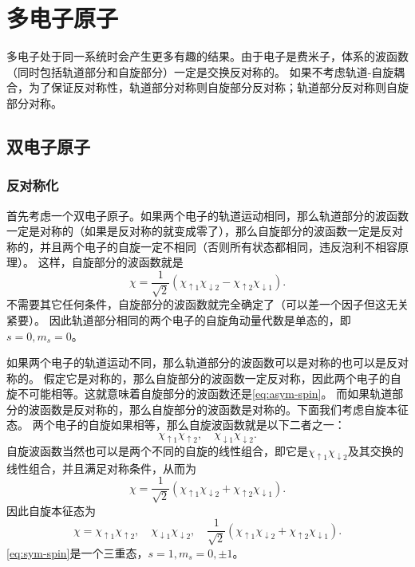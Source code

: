 \chapter{多电子原子}

多电子处于同一系统时会产生更多有趣的结果。由于电子是费米子，体系的波函数（同时包括轨道部分和自旋部分）一定是交换反对称的。
如果不考虑轨道-自旋耦合，为了保证反对称性，轨道部分对称则自旋部分反对称；轨道部分反对称则自旋部分对称。

\section{双电子原子}

\subsection{反对称化}

首先考虑一个双电子原子。如果两个电子的轨道运动相同，那么轨道部分的波函数一定是对称的（如果是反对称的就变成零了），那么自旋部分的波函数一定是反对称的，并且两个电子的自旋一定不相同（否则所有状态都相同，违反泡利不相容原理）。
这样，自旋部分的波函数就是
\begin{equation}
    \chi = \frac{1}{\sqrt{2}} (\chi_{\uparrow 1} \chi_{\downarrow 2} - \chi_{\uparrow 2} \chi_{\downarrow 1}).
    \label{eq:asym-spin}
\end{equation}
不需要其它任何条件，自旋部分的波函数就完全确定了（可以差一个因子但这无关紧要）。
因此轨道部分相同的两个电子的自旋角动量代数是单态的，即$s=0, m_s=0$。

如果两个电子的轨道运动不同，那么轨道部分的波函数可以是对称的也可以是反对称的。
假定它是对称的，那么自旋部分的波函数一定反对称，因此两个电子的自旋不可能相等。这就意味着自旋部分的波函数还是\eqref{eq:asym-spin}。
而如果轨道部分的波函数是反对称的，那么自旋部分的波函数是对称的。下面我们考虑自旋本征态。
两个电子的自旋如果相等，那么自旋波函数就是以下二者之一：
\[
    \chi_{\uparrow 1} \chi_{\uparrow 2}, \quad \chi_{\downarrow 1} \chi_{\downarrow 2}.
\]
自旋波函数当然也可以是两个不同的自旋的线性组合，即它是$\chi_{\uparrow 1} \chi_{\downarrow 2}$及其交换的线性组合，并且满足对称条件，从而为
\[
    \chi = \frac{1}{\sqrt{2}} (\chi_{\uparrow 1} \chi_{\downarrow 2} + \chi_{\uparrow 2} \chi_{\downarrow 1}).
\]
因此自旋本征态为
\begin{equation}
    \chi = \chi_{\uparrow 1} \chi_{\uparrow 2}, \quad \chi_{\downarrow 1} \chi_{\downarrow 2}, \quad \frac{1}{\sqrt{2}} (\chi_{\uparrow 1} \chi_{\downarrow 2} + \chi_{\uparrow 2} \chi_{\downarrow 1}).
    \label{eq:sym-spin}
\end{equation}
\eqref{eq:sym-spin}是一个三重态，$s=1, m_s=0, \pm 1$。

